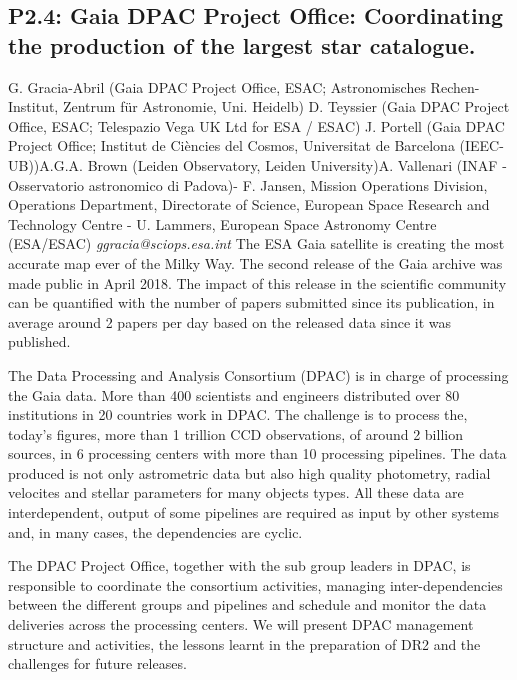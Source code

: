 \documentclass{report}
\begin{document}
\subsection*{P2.4: Gaia DPAC Project Office: Coordinating the production of the largest star catalogue.}
\bigskip
G. Gracia-Abril (Gaia DPAC Project Office, ESAC; Astronomisches Rechen-Institut, Zentrum für Astronomie, Uni. Heidelb) \newline D. Teyssier (Gaia DPAC Project Office, ESAC; Telespazio Vega UK Ltd for ESA / ESAC) \newline  J. Portell (Gaia DPAC Project Office; Institut de Ciències del Cosmos, Universitat de Barcelona (IEEC- UB))\newline  A.G.A. Brown (Leiden Observatory, Leiden University)\newline A. Vallenari (INAF - Osservatorio astronomico di Padova)\newline  - F. Jansen, Mission Operations Division, Operations Department, Directorate of Science, European Space Research and Technology Centre
- U. Lammers, European Space Astronomy Centre (ESA/ESAC)\newline\newline
{\it ggracia@sciops.esa.int}\newline
\newline\newline
The ESA Gaia satellite is creating the most accurate map ever of the Milky Way.  The second release of the Gaia archive was made public in April 2018. The impact of this release in the scientific community can be quantified with the number of papers submitted since its publication, in average around 2 papers per day based on the released data since it was published. 

The Data Processing and Analysis Consortium (DPAC) is in charge of processing the Gaia data. More than 400 scientists and engineers  distributed over 80 institutions in 20 countries work in DPAC. The  challenge is to process the, today's figures, more than 1 trillion CCD observations, of around 2 billion sources, in 6 processing centers with more than 10 processing pipelines. The data produced is  not only astrometric data but also high quality photometry, radial velocites and stellar parameters for many objects types. All these data are interdependent, output of some pipelines are required as input by other systems and, in many cases, the dependencies are cyclic.

The DPAC Project Office, together with the sub group leaders in DPAC, is responsible to coordinate the consortium activities, managing inter-dependencies between the different groups and pipelines and schedule and monitor the data deliveries across the processing centers. We will present DPAC management structure and activities, the lessons learnt in the preparation of DR2 and the challenges for future releases.\newline
\newpage
\end{document}
